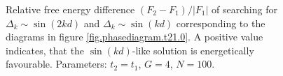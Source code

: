 \begin{figure}
\begin{center}

\caption{Relative free energy difference $(F_2 - F_1) / |F_1|$ of searching for $\Delta_k \sim \sin(2kd)$ and $\Delta_k\sim \sin(kd)$ corresponding to the diagrams in figure \ref{fig.phasediagram.t21.0}. A positive value indicates, that the $\sin(kd)$-like solution is energetically favourable. Parameters: $t_2 = t_1$, $G = 4$, $N = 100$. }
\label{fig.energydifference.t21.0}
\end{center}
\end{figure}
